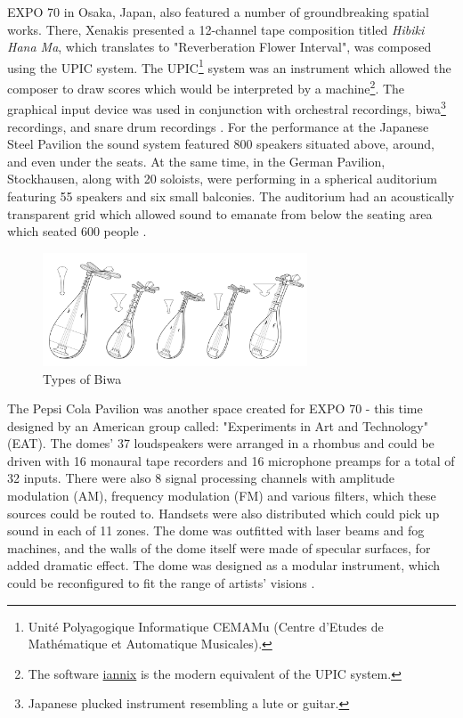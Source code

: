 EXPO 70 in Osaka, Japan, also featured a number of groundbreaking spatial works. There, Xenakis presented a 12-channel tape composition titled \textit{Hibiki Hana Ma}, which translates to "Reverberation Flower Interval", was composed using the UPIC system. The UPIC\footnote{Unité Polyagogique Informatique CEMAMu (Centre d'Etudes de Mathématique et Automatique Musicales).} system was an instrument which allowed the composer to draw scores which would be interpreted by a machine\footnote{The software \href{https://www.iannix.org/en/whatisiannix/}{iannix} is the modern equivalent of the UPIC system.}. The graphical input device was used in conjunction with orchestral recordings, biwa\footnote{Japanese plucked instrument resembling a lute or guitar.} recordings, and snare drum recordings \cite{IannisXe73:online}. For the performance at the Japanese Steel Pavilion the sound system featured 800 speakers situated above, around, and even under the seats. At the same time, in the German Pavilion, Stockhausen, along with 20 soloists, were performing in a spherical auditorium featuring 55 speakers and six small balconies. The auditorium had an acoustically transparent grid which allowed sound to emanate from below the seating area which seated 600 people \cite{zvonar1999history}.

\begin{figure}[h]%
\centering
\includegraphics[width=0.7\textwidth]{img/types-of-biwa.jpg}
\caption{Types of Biwa \cite{FileType46:online}}
\end{figure}

The Pepsi Cola Pavilion was another space created for EXPO 70 - this time designed by an American group called: "Experiments in Art and Technology" (EAT). The domes' 37 loudspeakers were arranged in a rhombus and could be driven with 16 monaural tape recorders and 16 microphone preamps for a total of 32 inputs. There were also 8 signal processing channels with amplitude modulation (AM), frequency modulation (FM) and various filters, which these sources could be routed to. Handsets were also distributed which could pick up sound in each of 11 zones. The dome was outfitted with laser beams and fog machines, and the walls of the dome itself were made of specular surfaces, for added dramatic effect. The dome was designed as a modular instrument, which could be reconfigured to fit the range of artists' visions \cite{bertrand2012pepsi}.

